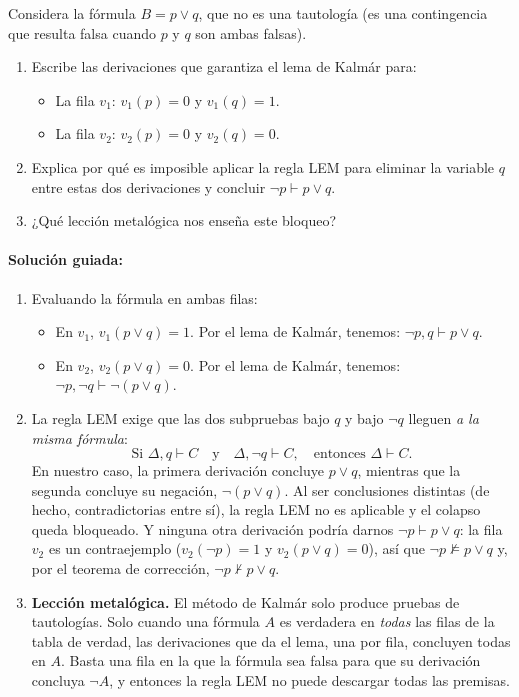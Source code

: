 \begin{pregunta}\label{e3-4}
Considera la fórmula $B = p \lor q$, que no es una tautología (es una contingencia que resulta falsa cuando $p$ y $q$ son ambas falsas).
\begin{enumerate}
    \item Escribe las derivaciones que garantiza el lema de Kalmár para:
    \begin{itemize}
        \item La fila $v_1$: $v_1(p) = 0$ y $v_1(q) = 1$.
        \item La fila $v_2$: $v_2(p) = 0$ y $v_2(q) = 0$.
    \end{itemize}
    \item Explica por qué es imposible aplicar la regla LEM para eliminar la variable $q$ entre estas dos derivaciones y concluir $\neg p \vdash p \lor q$.
    \item ¿Qué lección metalógica nos enseña este bloqueo?
\end{enumerate}

\paragraph{Solución guiada:}
\begin{enumerate}
    \item Evaluando la fórmula en ambas filas:
    \begin{itemize}
        \item En $v_1$, $v_1(p \lor q) = 1$. Por el lema de Kalmár, tenemos: $\neg p, q \vdash p \lor q$.
        \item En $v_2$, $v_2(p \lor q) = 0$. Por el lema de Kalmár, tenemos: $\neg p, \neg q \vdash \neg(p \lor q)$.
    \end{itemize}
    \item La regla LEM exige que las dos subpruebas bajo $q$ y bajo $\neg q$ lleguen \emph{a la misma fórmula}:
    \[
    \text{Si } \Delta, q \vdash C \quad\text{y}\quad \Delta, \neg q \vdash C, \quad\text{entonces } \Delta \vdash C.
    \]
    En nuestro caso, la primera derivación concluye $p \lor q$, mientras que la segunda concluye su negación, $\neg(p \lor q)$. Al ser conclusiones distintas (de hecho, contradictorias entre sí), la regla LEM no es aplicable y el colapso queda bloqueado. Y ninguna otra derivación podría darnos $\neg p \vdash p \lor q$: la fila $v_2$ es un contraejemplo ($v_2(\neg p) = 1$ y $v_2(p \lor q) = 0$), así que $\neg p \not\models p \lor q$ y, por el teorema de corrección, $\neg p \nvdash p \lor q$.
  \item \textbf{Lección metalógica.} El método de Kalmár solo produce pruebas de tautologías. Solo cuando una fórmula $A$ es verdadera en \emph{todas} las filas de la tabla de verdad, las derivaciones que da el lema, una por fila, concluyen todas en $A$. Basta una fila en la que la fórmula sea falsa para que su derivación concluya $\neg A$, y entonces la regla LEM no puede descargar todas las premisas.
\end{enumerate}

\end{pregunta}

